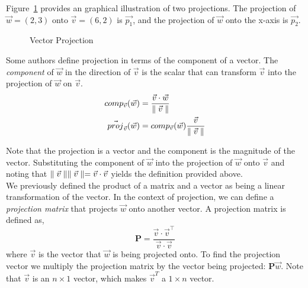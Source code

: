 \documentclass[12pt]{article}
\begin{document}
Figure~\ref{fig:projection} provides an graphical illustration of two projections. The projection of$\vec{w}=(2,3)$ onto $\vec{v}=(6,2)$ is $\vec{p_1}$, and the projection of $\vec{w}$ onto the x-axis is $\vec{p_2}$.

\begin{figure}[h!]
\centering
\caption{Vector Projection}
\label{fig:projection}
\end{figure}

Some authors define projection in terms of the component of a vector. The \emph{component} of $\vec{w}$ in the direction of $\vec{v}$ is the scalar that can transform $\vec{v}$ into the projection of $\vec{w}$ on $\vec{v}$. 
\begin{align*}
comp_{\vec{v}}(\vec{w}) &= \frac{\vec{v}\cdot\vec{w}}{\parallel\vec{v}\parallel} \\
\vec{proj}_{\vec{v}}(\vec{w}) &= comp_{\vec{v}}(\vec{w})\frac{\vec{v}}{\parallel\vec{v}\parallel}
\end{align*}

Note that the projection is a vector and the component is the magnitude of the vector. Substituting the component of $\vec{w}$ into the projection of $\vec{w}$ onto $\vec{v}$ and noting that $\parallel\vec{v}\parallel\parallel\vec{v}\parallel=\vec{v}\cdot\vec{v}$ yields the definition provided above. \\

We previously defined the product of a matrix and a vector as being a linear transformation of the vector. In the context of projection, we can define a \emph{projection matrix} that projects $\vec{w}$ onto another vector. A projection matrix is defined as,
\[
\mathbf{P} = \frac{\vec{v}\cdot\vec{v}^\top}{\vec{v}\cdot\vec{v}}
\]
where $\vec{v}$ is the vector that $\vec{w}$ is being projected onto. To find the projection vector we multiply the projection matrix by the vector being projected: $\mathbf{P}\vec{w}$. Note that $\vec{v}$ is an $n\times1$ vector, which makes $\vec{v}^T$ a $1\times n$ vector. \\
\end{document}
